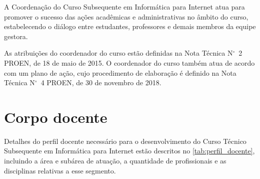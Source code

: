 \documentclass[
	12pt,				%
	openright,			%
	twoside,			%
	a4paper,			%
	chapter=TITLE,		%
	english,			%
	french,				%
	spanish,			%
	brazil,				%
	]{abntex2}
\newcommand{\n}{N$^\circ$}
\begin{document}
A Coordenação do Curso Subsequente em Informática para Internet atua para promover o sucesso das ações acadêmicas e administrativas no âmbito do curso, estabelecendo o diálogo entre estudantes, professores e demais membros da equipe gestora.

As atribuições do coordenador do curso estão definidas na Nota Técnica \n~2 PROEN, de 18 de maio de 2015. O coordenador do curso também atua de acordo com um plano de ação, cujo procedimento de elaboração é definido na Nota Técnica \n~4 PROEN, de 30 de novembro de 2018.


\chapter{Corpo docente}


Detalhes do perfil docente necessário para o desenvolvimento do Curso Técnico Subsequente em Informática para Internet  estão descritos no \autoref{tab:perfil_docente},  incluindo a área e subárea de atuação, a quantidade de profissionais e as disciplinas relativas a esse segmento.
\end{document}
